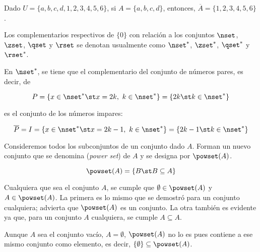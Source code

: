 \begin{example}
  Dado $U = \{a, b, c, d, 1, 2, 3, 4, 5, 6\}$, si $A = \{a, b, c, d\}$,
  entonces, $\overline{A} = \{1, 2, 3, 4, 5, 6\}$.

  Los complementarios respectivos de $\{0\}$ con relación a los conjuntos
  $\nset$, $\zset$, $\qset$ y $\rset$ se denotan usualmente como
  $\nset^{*}$, $\zset^{*}$, $\qset^{*}$ y $\rset^{*}$.

  En $\nset^{*}$, se tiene que el complementario del conjunto de números
  pares, es decir, de

  \[ P = \{x \in \nset^* \st x = 2k, \ k \in \nset^*\} = \{2k \st k \in
  \nset^*\} \]

  \noindent es el conjunto de los números impares:

  \[ \overline{P} = I = \{x \in \nset^* \st x = 2k - 1, \ k \in \nset^*\} =
  \{2k - 1 \st  k \in \nset^*\} \]
\end{example}

Consideremos todos los subconjuntos de un conjunto dado $A$. Forman un nuevo
conjunto que se denomina  (\emph{power set})
de $A$ y se designa por $\powset(A)$.

$$ \powset(A) = \{B \st B \subseteq A\} $$

Cualquiera que sea el conjunto $A$, se cumple que $\emptyset \in \powset(A)$
y $A \in \powset(A)$. La primera es lo mismo que se demostró para un
conjunto cualquiera; advierta que $\powset(A)$ es un conjunto. La otra
también es evidente ya que, para un conjunto $A$ cualquiera, se cumple $A
\subseteq A$.

Aunque $A$ sea el conjunto vacío, $A = \emptyset$, $\powset(A)$ no lo es
pues contiene a ese mismo conjunto como elemento, es decir, $\{\emptyset\}
\subseteq \powset(A)$.

